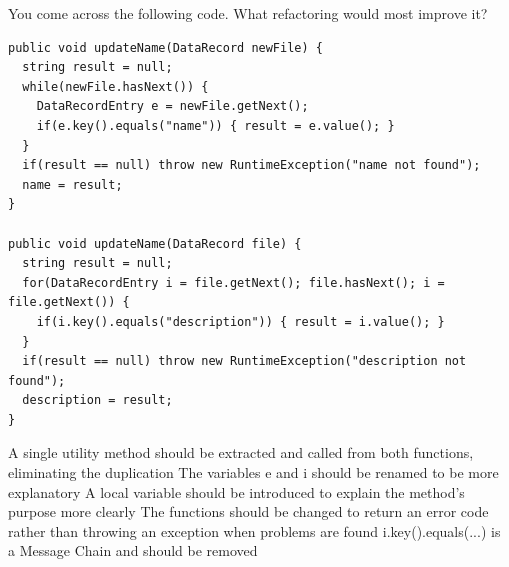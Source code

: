 \documentclass{exam}
\begin{document}
\begin{questions}




\question[1] You come across the following code.  What refactoring would most improve it?
\begin{lstlisting}
public void updateName(DataRecord newFile) {
  string result = null;
  while(newFile.hasNext()) {
    DataRecordEntry e = newFile.getNext();
    if(e.key().equals("name")) { result = e.value(); }
  }
  if(result == null) throw new RuntimeException("name not found");
  name = result;
}

public void updateName(DataRecord file) {
  string result = null;
  for(DataRecordEntry i = file.getNext(); file.hasNext(); i = file.getNext()) {
    if(i.key().equals("description")) { result = i.value(); }
  }
  if(result == null) throw new RuntimeException("description not found");
  description = result;
}
\end{lstlisting}

\begin{choices}
\correctchoice A single utility method should be extracted and called from both functions, eliminating the duplication
\choice The variables e and i should be renamed to be more explanatory
\choice A local variable should be introduced to explain the method's purpose more clearly
\choice The functions should be changed to return an error code rather than throwing an exception when problems are found
\choice i.key().equals(...) is a Message Chain and should be removed
\end{choices}


\end{questions}
\end{document}
